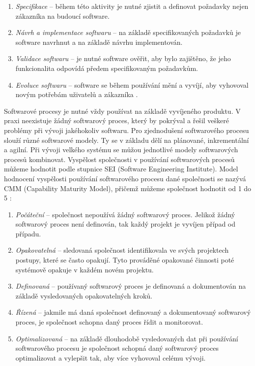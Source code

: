 \documentclass[czech,master]{diploma}
\begin{document}
\begin{enumerate}
\item \textit{Specifikace} -- během této aktivity je nutné zjistit a definovat požadavky nejen zákazníka na budoucí software.
\item \textit{Návrh a implementace softwaru} -- na základě specifikovaných požadavků je software navrhnut a na základě návrhu implementován.
\item \textit{Validace softwaru }-- je nutné software ověřit, aby bylo zajištěno, že jeho funkcionalita odpovídá předem specifikovaným požadavkům.
\item \textit{Evoluce softwaru} -- software se během používání mění a vyvíjí, aby vyhovoval novým potřebám uživatelů a zákazníka .
\end{enumerate}

Softwarové procesy je nutné vždy používat na základě vyvíjeného produktu. V praxi neexistuje žádný softwarový proces, který by pokrýval a řešil veškeré problémy při vývoji jakéhokoliv softwaru. Pro zjednodušení softwarového procesu slouží různé softwarové modely. Ty se v základu dělí na plánované, inkrementální a agilní. Při vývoji velkého systému se můžou jednotlivé modely softwarových procesů kombinovat. Vyspělost společnosti v používání softwarových procesů můžeme hodnotit podle stupnice SEI (Software
Engineering Institute). Model hodnocení vyspělosti používání softwarového procesu dané společnosti se nazývá CMM (Capability Maturity Model), přičemž můžeme společnost hodnotit od 1 do 5 \cite{ref:sw_process_vondrak}:

\begin{enumerate}
\item \textit{Počáteční} -- společnost nepoužívá žádný softwarový proces. Jelikož žádný softwarový proces není definován, tak každý projekt je vyvíjen případ od případu.
\item \textit{Opakovatelná} -- sledovaná společnost identifikovala ve svých projektech postupy, které se často opakují. Tyto prováděné opakované činnosti poté systémově opakuje v každém novém projektu.
\item \textit{Definovaná} -- používaný softwarový proces je definovaná a dokumentován na základě vysledovaných opakovatelných kroků.
\item \textit{Řízená} -- jakmile má daná společnost definovaný a dokumentovaný softwarový proces, je společnost schopna daný proces řídit a monitorovat.
\item \textit{Optimalizovaná} -- na základě dlouhodobě vysledovaných dat při používání softwarového procesu je společnost schopná daný softwarový proces optimalizovat a vylepšit tak, aby více vyhovoval celému vývoji.
\end{enumerate}
\end{document}
